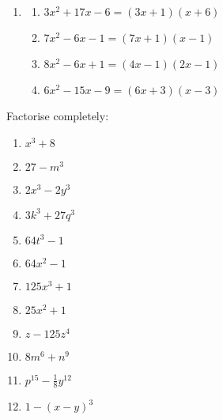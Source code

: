 \begin{solutions}{}
{\begin{enumerate}[itemsep=5pt, label=\textbf{\arabic*}. ]
\begin{multicols}{2}
\begin{enumerate}[itemsep=2pt, label=\textbf{(\alph*)} ]
\item $3{x}^{2}+19x+6=(3x + 1)(x + 6)$%
\item $6{x}^{2}+7x+2=(6x + 1)(x + 1)$%
\item $12{x}^{2}+8x+1=(6x + 1)(2x + 1)$%
\item $8{x}^{2}+6x+1=(2x + 1)(4x + 1)$%
\end{enumerate}
\end{multicols}

\item %
\begin{multicols}{2}
\begin{enumerate}[itemsep=2pt, label=\textbf{(\alph*)} ] 
\item $3{x}^{2}+17x-6=(3x + 1)(x + 6)$%
\item $7{x}^{2}-6x-1=(7x + 1)(x - 1)$%
\item $8{x}^{2}-6x+1=(4x - 1)(2x - 1)$%
\item $6{x}^{2}-15x-9=(6x + 3)(x - 3)$%
\end{enumerate}
\end{multicols}
\end{enumerate}

}
\end{solutions}
\begin{exercises}{}
{
Factorise completely:
\begin{multicols}{2}
\begin{enumerate}[itemsep=2pt, label=\textbf{\arabic*}. ] 
\item ${x}^{3}+8$
\item $27-m^{3}$
\item $2x^{3}-2y^{3}$
\item $3k^{3} + 27q^{3}$
\item $64t^{3}-1$
\item $64x^{2} -1$
\item $125x^{3} +1$
\item $25x^{2} +1$
\item $z-125z^4{}$
\item $8m^{6} + n^{9}$
\item $p^{15} - \frac{1}{8}y^{12}$
\item $1- (x-y)^3$
\end{enumerate}
\end{multicols}

}
\end{exercises}

